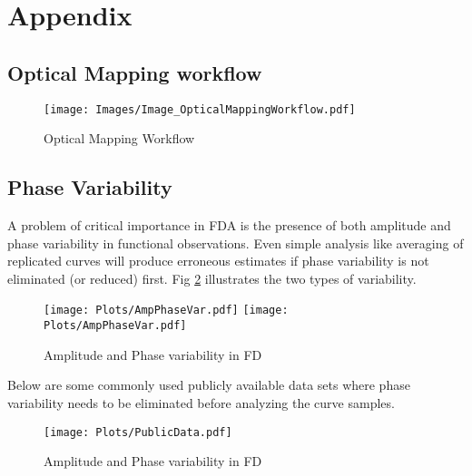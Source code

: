 \section*{Appendix}

\subsection*{Optical Mapping workflow}
\begin{figure}[H]
\begin{center}
\texttt{[image: Images/Image\_OpticalMappingWorkflow.pdf]}
\end{center}
\caption{Optical Mapping Workflow}
\label{fig:OpticalMapping}
\end{figure}


\subsection*{Phase Variability} \label{App_Phase}
A problem of critical importance in FDA is the presence of both amplitude and phase variability in functional observations. Even simple analysis like averaging of replicated curves will produce erroneous estimates if phase variability is not eliminated (or reduced) first. Fig \ref{fig:Fig3_AmpPhase} illustrates the two types of variability. 
\begin{figure}[H]
\begin{center}
\texttt{[image: Plots/AmpPhaseVar.pdf]}
\texttt{[image: Plots/AmpPhaseVar.pdf]}
\end{center}
\caption{Amplitude and Phase variability in FD}
\label{fig:Fig3_AmpPhase}
\end{figure}
Below are some commonly used publicly available data sets where phase variability needs to be eliminated before analyzing the curve samples. 
\begin{figure}[H]
\begin{center}
\texttt{[image: Plots/PublicData.pdf]}
\end{center}
\caption{Amplitude and Phase variability in FD}
\label{fig:Fig3_growthM}
\end{figure}


